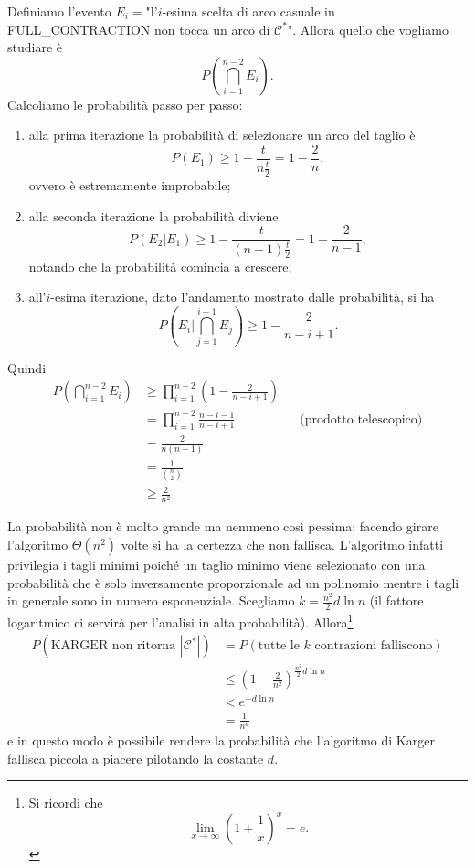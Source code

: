 Definiamo l'evento $E_i=$"l'$i$-esima scelta di arco casuale in FULL\_CONTRACTION non tocca un arco di $\mathcal{C^*}$". Allora quello che vogliamo studiare
è
\[
P\left(\bigcap_{i=1}^{n-2}E_i\right).
\]
Calcoliamo le probabilità passo per passo:
\begin{enumerate}
\item alla prima iterazione la probabilità di selezionare un arco del taglio è
\[
P(E_1)\geq 1-\frac{t}{n\frac{t}{2}}=1-\frac{2}{n},
\]
ovvero è estremamente improbabile;
\item alla seconda iterazione la probabilità diviene
\[
P(E_2|E_1)\geq 1-\frac{t}{(n-1)\frac{t}{2}}=1-\frac{2}{n-1},
\]
notando che la probabilità comincia a crescere;
\item all'$i$-esima iterazione, dato l'andamento mostrato dalle probabilità, si ha
\[
P\left(E_i|\bigcap_{j=1}^{i-1}E_j\right)\geq 1-\frac{2}{n-i+1}.
\]
\end{enumerate}
Quindi
\begin{align*}
P\left(\bigcap_{i=1}^{n-2}E_i\right)&\geq\prod_{i=1}^{n-2}\left(1-\frac{2}{n-i+1}\right) \\
&=\prod_{i=1}^{n-2}\frac{n-i-1}{n-i+1} && \text{(prodotto telescopico)} \\
&=\frac{2}{n(n-1)} \\
&=\frac{1}{\binom{n}{2}} \\
&\geq \frac{2}{n^2}
\end{align*}

La probabilità non è molto grande ma nemmeno così pessima: facendo girare l'algoritmo $\Theta(n^2)$ volte si ha la certezza che non fallisca. L'algoritmo infatti privilegia i tagli minimi poiché un taglio minimo viene selezionato con una probabilità che è solo inversamente proporzionale ad un polinomio mentre i tagli in generale sono in numero esponenziale. Scegliamo $k=\frac{n^2}{2}d\ln n$ (il fattore logaritmico ci servirà per l'analisi in alta probabilità). Allora\footnote{Si ricordi che \[ \lim_{x\to\infty}\left(1+\frac{1}{x}\right)^x=e. \]}
\begin{align*}
P(\text{KARGER non ritorna }|\mathcal{C^*}|)&=P(\text{tutte le }k\text{ contrazioni falliscono}) \\
&\leq \left(1-\frac{2}{n^2}\right)^{\frac{n^2}{2}d\ln n} \\
&< e^{-d\ln n} \\
&=\frac{1}{n^d}
\end{align*}
e in questo modo è possibile rendere la probabilità che l'algoritmo di Karger fallisca piccola a piacere pilotando la costante $d$.

